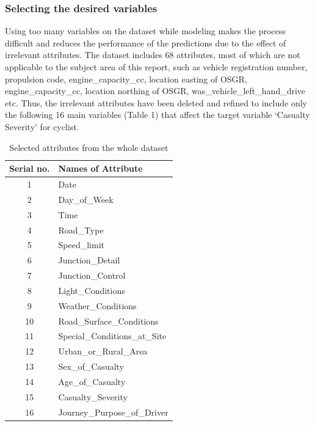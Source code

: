 \documentclass[
  a4paper,
]{article}
\begin{document}
\hypertarget{selecting-the-desired-variables}{%
\subsubsection{Selecting the desired
variables}\label{selecting-the-desired-variables}}

Using too many variables on the dataset while modeling makes the process
difficult and reduces the performance of the predictions due to the
effect of irrelevant attributes. The dataset includes 68 attributes,
most of which are not applicable to the subject area of this report,
such as vehicle registration number, propulsion code,
engine\_capacity\_cc, location easting of OSGR, engine\_capacity\_cc,
location northing of OSGR, was\_vehicle\_left\_hand\_drive etc. Thus,
the irrelevant attributes have been deleted and refined to include only
the following 16 main variables (Table 1) that affect the target
variable `Casualty Severity' for cyclist.

\begin{table}[!htb]
\caption{Selected attributes from the whole dataset}
\bigskip
\centering
\begin{tabular}{c l}
\hline\hline
Serial no. & Names of Attribute\\ [0.75ex]
\hline
1 & Date  \\
2 & Day\_of\_Week \\
3 & Time \\
4 & Road\_Type \\
5 & Speed\_limit  \\
6 & Junction\_Detail \\
7 & Junction\_Control \\
8 & Light\_Conditions \\
9 & Weather\_Conditions  \\
10 & Road\_Surface\_Conditions \\
11 & Special\_Conditions\_at\_Site \\
12 & Urban\_or\_Rural\_Area \\ 
13 & Sex\_of\_Casualty  \\
14 & Age\_of\_Casualty \\
15 & Casualty\_Severity \\
16 & Journey\_Purpose\_of\_Driver \\ [1ex]
\hline
\end{tabular}
\label{tab:Table 1}
\end{table}

\newpage
\end{document}
